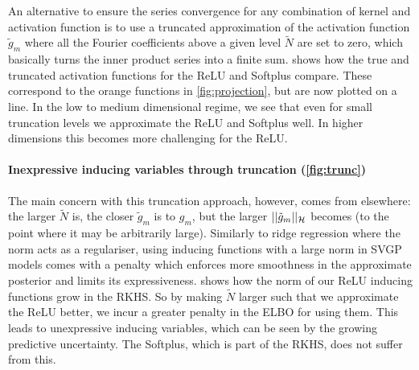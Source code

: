 An alternative to ensure the series convergence for any combination of kernel and activation function is to use a truncated approximation of the activation function $\tilde{g}_m$ where all the Fourier coefficients above a given level $\tilde N$ are set to zero, which basically turns the inner product series into a finite sum. %
 shows how the true and truncated activation functions for the ReLU and Softplus compare. These correspond to the orange functions in \cref{fig:projection}, but are now plotted on a line. In the low to medium dimensional regime, we see that even for small truncation levels we approximate the ReLU and Softplus well. In higher dimensions this becomes more challenging for the ReLU. %

\paragraph{Inexpressive inducing variables through truncation (\cref{fig:trunc})} The main concern with this truncation approach, however, comes from elsewhere: the larger $\tilde N$ is, the closer $\tilde{g}_m$ is to $g_m$, but the larger $\lvert\lvert \tilde{g}_m\rvert\rvert_{{\mathcal{H}}}$ becomes (to the point where it may be arbitrarily large). Similarly to ridge regression where the norm acts as a regulariser, using inducing functions with a large norm in SVGP models comes with a penalty which enforces more smoothness in the approximate posterior and limits its expressiveness.
 shows how the norm of our ReLU inducing functions grow in the RKHS. So by making $\tilde{N}$ larger such that we approximate the ReLU better, we incur a greater penalty in the ELBO for using them. This leads to unexpressive inducing variables, which can be seen by the growing predictive uncertainty. The Softplus, which is part of the RKHS, does not suffer from this.

